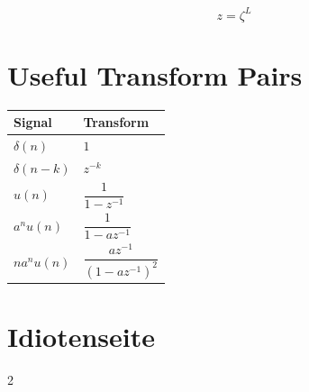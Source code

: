 \[
z=\zeta^L
\]

\section{Useful Transform Pairs}
\begin{tabular}{|l|l|}
\hline
Signal & Transform\\
\hline
$\delta(n)$ & $1$\\
\hline
$\delta(n-k)$ & $z^{-k}$\\
\hline
$u(n)$ &
$\dfrac1{1-z^{-1}}$\\
\hline
$a^nu(n)$ &
$\dfrac1{1-az^{-1}}$\\
\hline
$na^nu(n)$ &
$\dfrac{az^{-1}}
{(1-az^{-1})^2}$\\
\hline
\end{tabular}


\section{Idiotenseite}\label{app:Idiotenseite}



\begin{multicols}{2}







\end{multicols}




